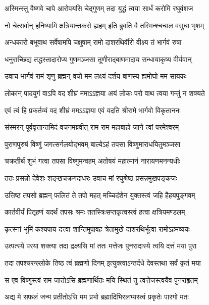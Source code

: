 \twolineshloka
{अस्मिन्स्तु वैष्णवे चापे आरोपयसि चेद्गुणम्}
{तदा युद्धं त्वया सार्धं करोमि रघुवंशज} %

\twolineshloka
{नो चेत्सर्वान् हनिष्यामि क्षत्रियान्तकरो ह्यहम्}
{इति ब्रुवति वै तस्मिन्श्चचाल वसुधा भृशम्} %

\twolineshloka
{अन्धकारो बभूवाथ सर्वेषामपि चक्षुषाम्}
{रामो दाशरथिर्वीरो वीक्ष्य तं भार्गवं रुषा} %

\twolineshloka
{धनुराच्छिद्य तद्धस्तादारोप्य गुणमञ्जसा}
{तूणीराद्बाणमादाय सन्धायाकृष्य वीर्यवान्} %

\twolineshloka
{उवाच भार्गवं रामं शृणु ब्रह्मन् वचो मम}
{लक्ष्यं दर्शय बाणस्य ह्यमोघो मम सायकः} %

\twolineshloka
{लोकान् पादयुगं वाऽपि वद शीघ्रं ममाऽऽज्ञया}
{अयं लोकः परो वाथ त्वया गन्तुं न शक्यते} %

\twolineshloka
{एवं त्वं हि प्रकर्तव्यं वद शीघ्रं ममऽऽज्ञया}
{एवं वदति श्रीरामे भार्गवो विकृताननः} %

\twolineshloka
{संस्मरन् पूर्ववृत्तान्तमिदं वचनमब्रवीत्}
{राम राम महाबाहो जाने त्वां परमेश्वरम्} %

\twolineshloka
{पुराणपुरुषं विष्णुं जगत्सर्गलयोद्भवम्}
{बाल्येऽहं तपसा विष्णुमाराधयितुमञ्जसा} %

\twolineshloka
{चक्रतीर्थं शुभं गत्वा तपसा विष्णुमन्वहम्}
{अतोषयं महात्मानं नारायणमनन्यधीः} %

\twolineshloka
{ततः प्रसन्नो देवेशः शङ्खचक्रगदाधरः}
{उवाच मां रघुश्रेष्ठ प्रसन्नमुखपङ्कजः} %


\twolineshloka
{उत्तिष्ठ तपसो ब्रह्मन् फलितं ते तपो महत्}
{मच्चिदंशेन युक्तस्त्वं जहि हैहयपुङ्गवम्} %

\twolineshloka
{कार्तवीर्यं पितृहणं यदर्थं तपसः श्रमः}
{ततस्त्रिःसप्तकृत्वस्त्वं हत्वा क्षत्रियमण्डलम्} %

\twolineshloka
{कृत्स्नां भूमिं कश्यपाय दत्त्वा शान्तिमुपावह}
{त्रेतामुखे दाशरथिर्भूत्वा रामोऽहमव्ययः} %

\twolineshloka
{उत्पत्स्ये परया शक्त्या तदा द्रक्ष्यसि मां ततः}
{मत्तेजः पुनरादास्ये त्वयि दत्तं मया पुरा} %

\twolineshloka
{तदा तपश्चरन्ल्लोके तिष्ठ त्वं ब्रह्मणो दिनम्}
{इत्युक्त्वाऽन्तर्दधे देवस्तथा सर्वं कृतं मया} %

\twolineshloka
{स एव विष्णुस्त्वं राम जातोऽसि ब्रह्मणार्थितः}
{मयि स्थितं तु त्वत्तेजस्त्वयैव पुनराहृतम्} %

\twolineshloka
{अद्य मे सफलं जन्म प्रतीतोऽसि मम प्रभो}
{ब्रह्मादिभिरलभ्यस्त्वं प्रकृतेः पारगो मतः} %

